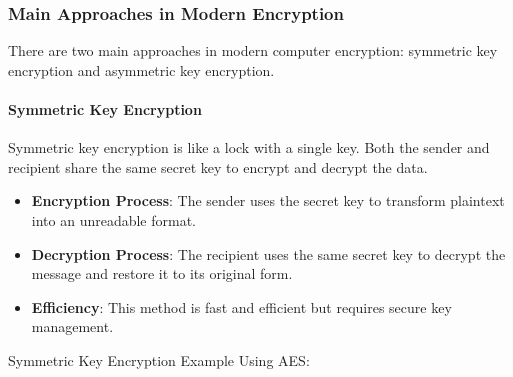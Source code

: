 \subsubsection{Main Approaches in Modern Encryption}

There are two main approaches in modern computer encryption: symmetric key encryption and asymmetric key encryption.

\paragraph{Symmetric Key Encryption}

Symmetric key encryption is like a lock with a single key. Both the sender and recipient share the same secret key to encrypt and decrypt the data.

\begin{itemize}
    \item \textbf{Encryption Process}: The sender uses the secret key to transform plaintext into an unreadable format.
    \item \textbf{Decryption Process}: The recipient uses the same secret key to decrypt the message and restore it to its original form.
    \item \textbf{Efficiency}: This method is fast and efficient but requires secure key management.
\end{itemize}

Symmetric Key Encryption Example Using AES:

